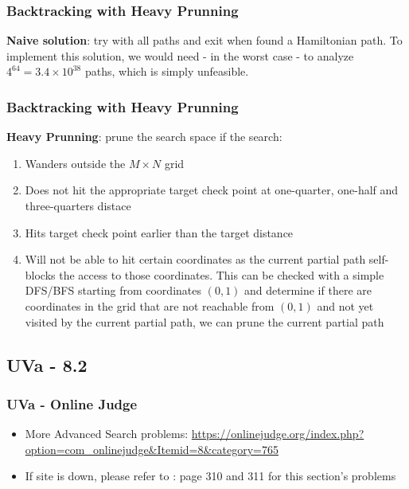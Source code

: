 \documentclass{beamer}
\begin{document}
\begin{frame}[fragile]
\frametitle{Backtracking with Heavy Prunning}

\textbf{Naive solution}: try with all paths and exit when found a Hamiltonian path. To implement this solution, we would need - in the worst case - to analyze $4^{64} = 3.4\times10^{38}$ paths, which is simply unfeasible.

\end{frame}

\begin{frame}[fragile]
\frametitle{Backtracking with Heavy Prunning}

\textbf{Heavy Prunning}: prune the search space if the search:
\begin{enumerate}
    \item Wanders outside the $M\times N$ grid
    \item Does not hit the appropriate target check point at one-quarter, one-half and three-quarters distace
    \item Hits target check point earlier than the target distance
    \item Will not be able to hit certain coordinates as the current partial path self-blocks the access to those coordinates. This can be checked with a simple DFS/BFS starting from coordinates $(0,1)$ and determine if there are coordinates in the grid that are not reachable from $(0,1)$ and not yet visited by the current partial path, we can prune the current partial path
\end{enumerate}

\end{frame}


\subsection{UVa - 8.2}
\begin{frame}[fragile]
\frametitle{UVa - Online Judge}
	\begin{itemize}
	    \item More Advanced Search problems: \url{https://onlinejudge.org/index.php?option=com_onlinejudge&Itemid=8&category=765}
	    \item If site is down, please refer to \cite{Halim}: page 310 and 311 for this section's problems
	\end{itemize}
\end{frame}
\end{document}
